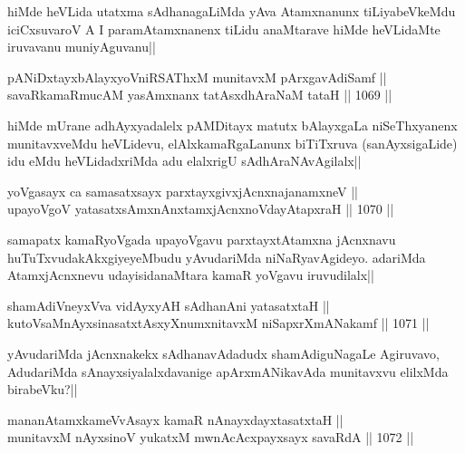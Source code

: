 \begin{artha}
hiMde heVLida utatxma sAdhanagaLiMda yAva Atamxnanunx tiLiyabeVkeMdu iciCxsuvaroV A I paramAtamxnanenx tiLidu anaMtarave hiMde heVLidaMte iruvavanu muniyAguvanu||
\end{artha}


\begin{shl}
pANiDxtayxbAlayxyoVniRSAThxM munitavxM pArxgavAdiSamf || \\
savaRkamaRmucAM yasAmxnanx tatAsxdhAraNaM tataH ||  1069 ||  
\end{shl}

\begin{artha}
hiMde mUrane adhAyxyadalelx pAMDitayx matutx bAlayxgaLa niSeThxyanenx munitavxveMdu heVLidevu, elAlxkamaRgaLanunx biTiTxruva (sanAyxsigaLide) idu eMdu heVLidadxriMda adu elalxrigU sAdhAraNAvAgilalx||
\end{artha}


\begin{shl}
yoVgasayx ca samasatxsayx parxtayxgivxjAcnxnajanamxneV || \\
upayoVgoV yatasatxsAmxnAnx\s \s tamxjAcnxnoVdayAtapxraH ||  1070 ||  
\end{shl}

\begin{artha}
samapatx kamaRyoVgada upayoVgavu parxtayxtAtamxna jAcnxnavu huTuTxvudakAkxgiyeyeMbudu yAvudariMda niNaRyavAgideyo. adariMda AtamxjAcnxnevu udayisidanaMtara kamaR yoVgavu iruvudilalx||
\end{artha}

\begin{shl}
shamAdiVneyxVva vidAyxyAH sAdhanAni yatasatxtaH || \\
kutoV\s saMnAyxsinasatxtAsxyXnumxnitavxM niSapxrXmANakamf ||  1071 ||  
\end{shl}

\begin{artha}
yAvudariMda jAcnxnakekx sAdhanavAdadudx shamAdiguNagaLe Agiruvavo, AdudariMda sAnayxsiyalalxdavanige apArxmANikavAda munitavxvu elilxMda birabeVku?||
\end{artha}

\begin{shl}
mananAtamxkameVvAsayx kamaR nAnayxdayxtasatxtaH || \\
munitavxM nAyxsinoV yukatxM mwnAcAcxpayxsayx savaRdA ||  1072 ||  
\end{shl}

